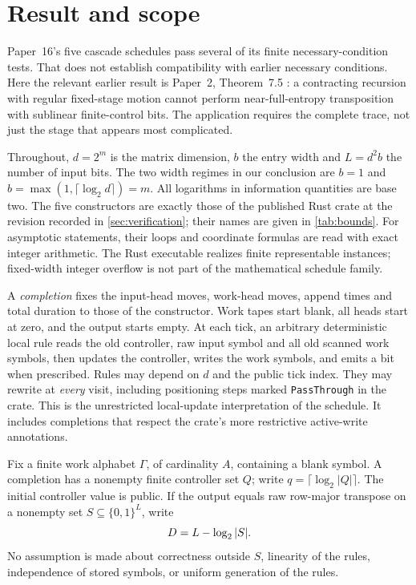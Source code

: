 \section{Result and scope}
\label{sec:result}

Paper~16's five cascade schedules pass several of its finite necessary-condition
tests. That does not establish compatibility with earlier necessary
conditions. Here the relevant earlier result is Paper~2, Theorem~7.5
\cite{SecondPaper2026}: a contracting recursion with regular fixed-stage
motion cannot perform near-full-entropy transposition with sublinear
finite-control bits. The application requires the complete trace, not just
the stage that appears most complicated.

Throughout, $d=2^m$ is the matrix dimension, $b$ the entry width and
$L=d^2b$ the number of input bits. The two width regimes in our conclusion
are $b=1$ and $b=\max(1,\lceil\log_2d\rceil)=m$. All logarithms in
information quantities are base two. The five constructors are exactly
those of the published Rust crate at the revision recorded in
\cref{sec:verification}; their names are given in \cref{tab:bounds}.
For asymptotic statements, their loops and coordinate formulas are read
with exact integer arithmetic. The Rust executable realizes finite
representable instances; fixed-width integer overflow is not part of the
mathematical schedule family.

A \emph{completion} fixes the input-head moves, work-head moves, append
times and total duration to those of the constructor. Work tapes start
blank, all heads start at zero, and the output starts empty. At each tick,
an arbitrary deterministic local rule reads the old controller, raw input
symbol and all old scanned work symbols, then updates the controller,
writes the work symbols, and emits a bit when prescribed. Rules may depend
on $d$ and the public tick index. They may rewrite at \emph{every} visit,
including positioning steps marked \texttt{PassThrough} in the crate.
This is the unrestricted local-update interpretation of the schedule.
It includes completions that respect
the crate's more restrictive active-write annotations.

Fix a finite work alphabet $\Gamma$, of cardinality $A$, containing a
blank symbol. A completion has a nonempty finite controller set $Q$;
write $q=\lceil\log_2|Q|\rceil$. The initial controller value is public.
If the output equals raw row-major transpose on a nonempty set
$S\subseteq\{0,1\}^L$, write
\[
 D=L-\log_2|S|.
\]
No assumption is made about correctness outside $S$, linearity of the
rules, independence of stored symbols, or uniform generation of the rules.

